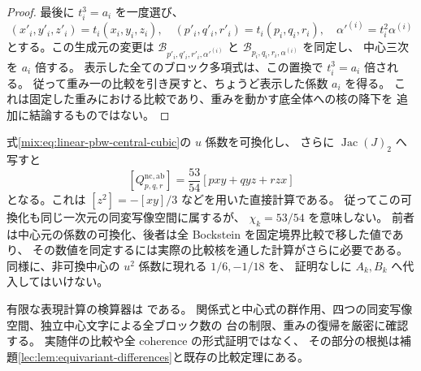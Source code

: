 \begin{proof}
最後に $t_i^3=a_i$ を一度選び、
\[
 (x'_i,y'_i,z'_i)=t_i(x_i,y_i,z_i),\quad
 (p'_i,q'_i,r'_i)=t_i(p_i,q_i,r_i),\quad
 \alpha'^{(i)}=t_i^2\alpha^{(i)}
\]
とする。この生成元の変更は
$\mathcal B_{p'_i,q'_i,r'_i,\alpha'^{(i)}}$ と
$\mathcal B_{p_i,q_i,r_i,\alpha^{(i)}}$ を同定し、
中心三次を $a_i$ 倍する。
表示した全てのブロック多項式は、この置換で $t_i^3=a_i$ 倍される。
従って重み一の比較を引き戻すと、ちょうど表示した係数 $a_i$ を得る。
これは固定した重みにおける比較であり、重みを動かす底全体への核の降下を
追加に結論するものではない。
\end{proof}

\begin{remark}[非可換中心の係数と比較係数の区別]
\label{lec:rem:numerical-scope}
式\eqref{mix:eq:linear-pbw-central-cubic}の $u$ 係数を可換化し、
さらに $\operatorname{Jac}(J)_2$ へ写すと
\[
 \left[Q_{p,q,r}^{\mathrm{nc,ab}}\right]
          =\frac{53}{54}[pxy+qyz+rzx]
\]
となる。これは $[z^2]=-[xy]/3$ などを用いた直接計算である。
従ってこの可換化も同じ一次元の同変写像空間に属するが、
$\chi_k=53/54$ を意味しない。
前者は中心元の係数の可換化、後者は全 Bockstein を固定境界比較で移した値であり、
その数値を同定するには実際の比較核を通した計算がさらに必要である。
同様に、非可換中心の $u^2$ 係数に現れる $1/6,-1/18$ を、
証明なしに $A_k,B_k$ へ代入してはいけない。

有限な表現計算の検算器は
 である。
関係式と中心式の群作用、四つの同変写像空間、独立中心文字による全ブロック数の
台の制限、重みの復帰を厳密に確認する。
実随伴の比較や全 coherence の形式証明ではなく、
その部分の根拠は補題\ref{lec:lem:equivariant-differences}と既存の比較定理にある。
\end{remark}
